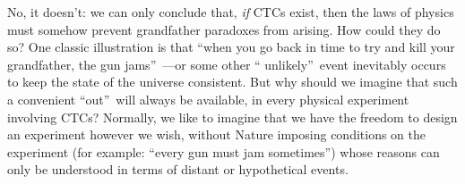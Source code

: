 \documentclass[12pt,onecolumn]{article}%
\begin{document}
No, it doesn't: we can only conclude that, \textit{if} CTCs exist, then the
laws of physics must somehow prevent grandfather paradoxes from arising. How
could they do so? One classic illustration is that \textquotedblleft when
you go back in time to try and kill your grandfather, the gun
jams\textquotedblright\ ---or some other \textquotedblleft
unlikely\textquotedblright\  event inevitably occurs to keep the state of the
universe consistent. But why should we imagine that such a convenient
\textquotedblleft out\textquotedblright\  will always be available, in every
physical experiment involving CTCs? Normally, we like to imagine that we
have the freedom to design an experiment however we wish, without Nature
imposing conditions on the experiment (for example: \textquotedblleft every
gun must jam sometimes\textquotedblright ) whose reasons can only be understood
in terms of distant or hypothetical events.
\end{document}
